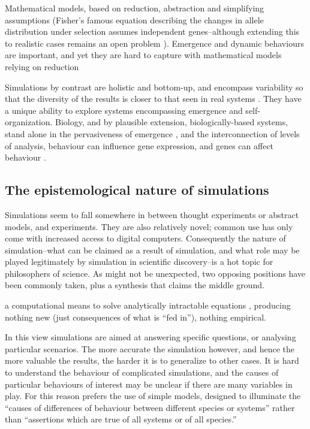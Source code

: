 Mathematical models, based on reduction, abstraction and simplifying assumptions (\eg Fisher's famous equation describing the changes in allele distribution under selection assumes independent genes--although extending this to realistic cases remains an open problem \autocite{Schuster2011}). Emergence and dynamic behaviours are important, and yet they are hard to capture with mathematical models relying on reduction \autocite{Ferrer:2008hv}

Simulations by contrast are holistic and bottom-up, and encompass variability so that the diversity of the results is closer to that seen in real systems \autocite{Ferrer:2008hv}. They have a unique ability to explore systems encompassing emergence and self-organization. Biology, and by plausible extension, biologically-based systems, stand alone in the pervasiveness of emergence \autocite{Bersini:2006ve}, and the
interconnection of levels of analysis, \eg behaviour can influence gene expression, and genes can affect behaviour \autocite{Krakauer2011}.

\subsection{The epistemological nature of simulations}\label{the-epistemological-nature-of-simulations}

Simulations seem to fall somewhere in between thought experiments or abstract models, and experiments. They are also relatively novel; common use has only come with increased access to digital computers. Consequently the nature of simulation--what can be claimed as a result of simulation, and what role may be played legitimately by simulation in scientific discovery--is a hot topic for philosophers of science. As might not be unexpected, two opposing positions have been commonly taken, plus a synthesis that claims the middle ground.

\label{simulations-are-just-calculators}

a computational means to solve analytically intractable equations \autocite[31]{Winsberg2010}, producing nothing new (just consequences
of what is ``fed in''\autocite{DiPaolo2000}), nothing empirical.


In this view simulations are aimed at answering specific questions, or analysing particular scenarios. The more accurate the simulation however, and hence the more valuable the results, the harder it is to generalize to other cases. It is hard to understand the behaviour of complicated simulations, and the causes of particular behaviours of interest may be unclear if there are many variables in play. For this reason \autocite{MaynardSmith1974} prefers the use of simple models, designed to illuminate the ``causes of differences of behaviour between different species or systems'' rather than ``assertions which are true of all systems or of all species.''


